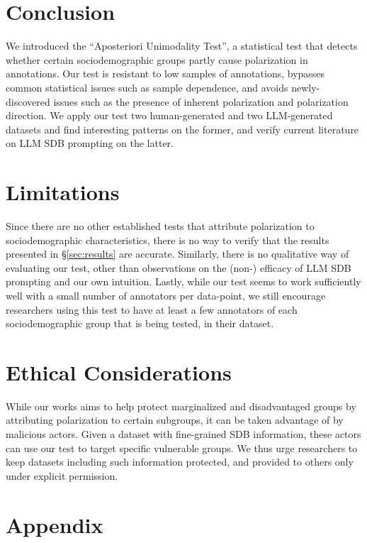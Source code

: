 \documentclass{article}
\begin{document}
\section{Conclusion}

We introduced the ``Aposteriori Unimodality Test'', a statistical test that detects whether certain sociodemographic groups partly cause polarization in annotations. Our test is resistant to low samples of annotations, bypasses common statistical issues such as sample dependence, and avoids newly-discovered issues such as the presence of inherent polarization and polarization direction. We apply our test two human-generated and two \ac{LLM}-generated datasets and find interesting patterns on the former, and verify current literature on \ac{LLM} \ac{SDB} prompting on the latter.


\section{Limitations}

Since there are no other established tests that attribute polarization to sociodemographic characteristics, there is no way to verify that the results presented in \S\ref{sec:results} are accurate. Similarly, there is no qualitative way of evaluating our test, other than observations on the (non-) efficacy of \ac{LLM} {SDB} prompting and our own intuition. Lastly, while our test seems to work sufficiently well with a small number of annotators per data-point, we still encourage researchers using this test to have at least a few annotators of each sociodemographic group that is being tested, in their dataset.


\section{Ethical Considerations}

While our works aims to help protect marginalized and disadvantaged groups by attributing polarization to certain subgroups, it can be taken advantage of by malicious actors. Given a dataset with fine-grained \ac{SDB} information, these actors can use our test to target specific vulnerable groups. We thus urge researchers to keep datasets including such information protected, and provided to others only under explicit permission.

\printbibliography


\appendix
\section{Appendix}
\end{document}
